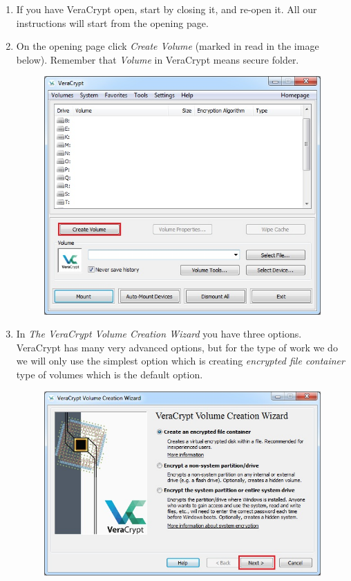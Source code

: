 \documentclass{tufte-handout}
\begin{document}
\begin{enumerate}

	\item If you have VeraCrypt open, start by closing it, and re-open it. All our instructions will start from the opening page.
	\item On the opening page click \textit{Create Volume} (marked in read in the image below). Remember that \textit{Volume} in VeraCrypt means secure folder.


	\begin{figure}%
		\includegraphics[width=.9\linewidth]{img/vc_install_1.png}
	\end{figure}
	\FloatBarrier
		
	\item In \textit{The VeraCrypt Volume Creation Wizard} you have three options. VeraCrypt has many very advanced options, but for the type of work we do we will only use the simplest option which is creating \textit{encrypted file container} type of volumes which is the default option.
	
	\begin{figure}
		\includegraphics[width=.9\linewidth]{img/vc_install_2.png}
	\end{figure}
	\FloatBarrier
	

\end{enumerate}
\end{document}

